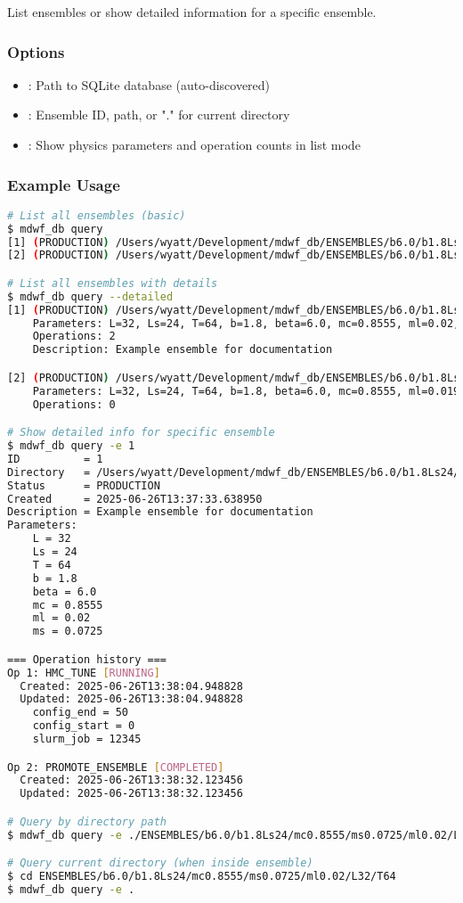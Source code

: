 \documentclass{article}
\newcommand{\code}[1]{\texttt{\detokenize{#1}}}
\begin{document}
List ensembles or show detailed information for a specific ensemble.

\subsubsection{Options}
\begin{itemize}
\item \code{--db-file DB_FILE}: Path to SQLite database (auto-discovered)
\item \code{-e ENSEMBLE, --ensemble}: Ensemble ID, path, or "." for current directory
\item \code{--detailed}: Show physics parameters and operation counts in list mode
\end{itemize}

\subsubsection{Example Usage}

\begin{lstlisting}[language=bash, caption=Query Examples]
# List all ensembles (basic)
$ mdwf_db query
[1] (PRODUCTION) /Users/wyatt/Development/mdwf_db/ENSEMBLES/b6.0/b1.8Ls24/mc0.8555/ms0.0725/ml0.02/L32/T64
[2] (PRODUCTION) /Users/wyatt/Development/mdwf_db/ENSEMBLES/b6.0/b1.8Ls24/mc0.8555/ms0.0725/ml0.0195/L32/T64

# List all ensembles with details
$ mdwf_db query --detailed
[1] (PRODUCTION) /Users/wyatt/Development/mdwf_db/ENSEMBLES/b6.0/b1.8Ls24/mc0.8555/ms0.0725/ml0.02/L32/T64
    Parameters: L=32, Ls=24, T=64, b=1.8, beta=6.0, mc=0.8555, ml=0.02, ms=0.0725
    Operations: 2
    Description: Example ensemble for documentation

[2] (PRODUCTION) /Users/wyatt/Development/mdwf_db/ENSEMBLES/b6.0/b1.8Ls24/mc0.8555/ms0.0725/ml0.0195/L32/T64
    Parameters: L=32, Ls=24, T=64, b=1.8, beta=6.0, mc=0.8555, ml=0.0195, ms=0.0725
    Operations: 0

# Show detailed info for specific ensemble
$ mdwf_db query -e 1
ID          = 1
Directory   = /Users/wyatt/Development/mdwf_db/ENSEMBLES/b6.0/b1.8Ls24/mc0.8555/ms0.0725/ml0.02/L32/T64
Status      = PRODUCTION
Created     = 2025-06-26T13:37:33.638950
Description = Example ensemble for documentation
Parameters:
    L = 32
    Ls = 24
    T = 64
    b = 1.8
    beta = 6.0
    mc = 0.8555
    ml = 0.02
    ms = 0.0725

=== Operation history ===
Op 1: HMC_TUNE [RUNNING]
  Created: 2025-06-26T13:38:04.948828
  Updated: 2025-06-26T13:38:04.948828
    config_end = 50
    config_start = 0
    slurm_job = 12345

Op 2: PROMOTE_ENSEMBLE [COMPLETED]
  Created: 2025-06-26T13:38:32.123456
  Updated: 2025-06-26T13:38:32.123456

# Query by directory path
$ mdwf_db query -e ./ENSEMBLES/b6.0/b1.8Ls24/mc0.8555/ms0.0725/ml0.02/L32/T64

# Query current directory (when inside ensemble)
$ cd ENSEMBLES/b6.0/b1.8Ls24/mc0.8555/ms0.0725/ml0.02/L32/T64
$ mdwf_db query -e .
\end{lstlisting}
\end{document}

